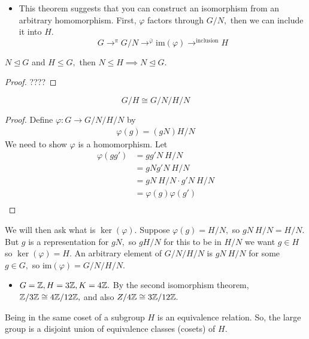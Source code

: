 \documentclass[a4paper]{article}
\begin{document}
\begin{itemize}
    \item This theorem suggests that you can construct an isomorphism from an arbitrary homomorphism. First, $\varphi$ factors through $G/N,$ then we can include it into $H.$
    \begin{equation}
        G\to^\pi G/N\to^{\bar\varphi}\mathrm{im}(\varphi)\to^{\text{inclusion}}H
    \end{equation}
\end{itemize}

\begin{theorem}
    $N\trianglelefteq G$ and $H\leq G,$ then $N\leq H\implies N\trianglelefteq G.$
    \begin{proof}
        ????
    \end{proof}
\end{theorem}
\begin{theorem}
    \begin{equation}
        G/H\cong G/N\Big/H/N
    \end{equation}
    \begin{proof}
        Define $\varphi:G\to G/N\Big/H/N$ by \begin{align}
            \varphi(g)=(gN)H/N
        \end{align}
        We need to show $\varphi$ is a homomorphism. Let \begin{align}
            \varphi(gg')&=gg'N\:H/N\\
            &=gNg'N\:H/N\\
            &=gN\:H/N\cdot g'N\:H/N\\
            &=\varphi(g)\varphi(g')\\
        \end{align}
    \end{proof}
    We will then ask what is $\ker(\varphi).$ Suppose $\varphi(g)=H/N,$ so $gN\:H/N=H/N.$ But $g$ is a representation for $gN,$ so $gH/N$ for this to be in $H/N$ we want $g\in H$ so $\ker(\varphi)=H.$ An arbitrary element of $G/N\Big/H/N$ is $gN\:H/N$ for some $g\in G,$ so $\mathrm{im}(\varphi)=G/N\Big/H/N.$
\end{theorem}
\begin{itemize}
    \item $G=\mathbb{Z},H=3\mathbb{Z},K=4\mathbb{Z}.$ By the second isomorphism theorem, $\mathbb{Z}/3\mathbb{Z}\cong 4\mathbb{Z}/12\mathbb{Z},$ and also $Z/4\mathbb{Z}\cong 3\mathbb{Z}/12\mathbb{Z}.$
\end{itemize}
\begin{definition}
    Being in the same coset of a subgroup $H$ is an equivalence relation. So, the large group is a disjoint union of equivalence classes (cosets) of $H.$
\end{definition}
\end{document}
